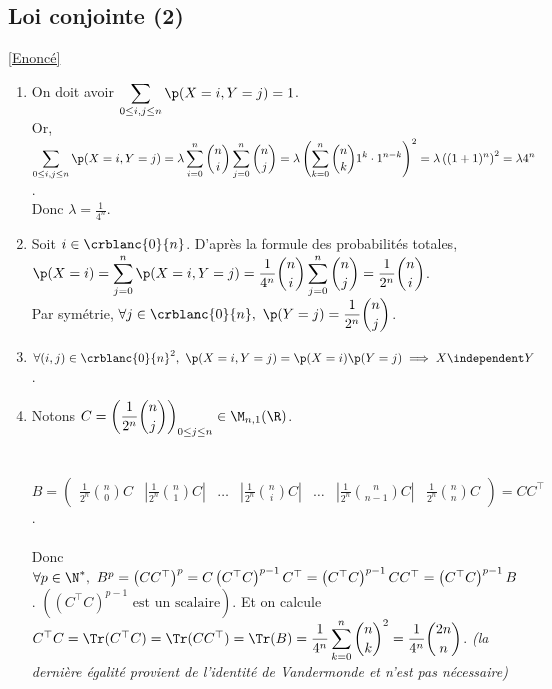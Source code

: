 \documentclass[8pt]{book}
\begin{document}
	\subsection{Loi conjointe (2) }
	\label{Loi conjointe 2 corrigé}
	\textcolor{blue}{\hyperref[Loi conjointe 2]{[Enoncé]}}\\
	\begin{enumerate}
		\item On doit avoir $\displaystyle\sum\limits_{0\leq i,j\leq n}\p(X=i,Y=j)=1$.\\
		Or, $\displaystyle\sum\limits_{0\leq i,j\leq n}\p(X=i,Y=j)=\lambda\sum\limits_{i=0}^n\binom{n}{i}\sum\limits_{j=0}^n\binom{n}{j}=\lambda\left(\sum\limits_{k=0}^n\binom{n}{k}1^k\cdot 1^{n-k}\right)^2=\lambda\left((1+1)^n\right)^2=\lambda 4^n$.\\
		Donc $\lambda=\displaystyle\frac{1}{4^n}$.
		\item Soit $i\in \crblanc{0}{n}$. D'après la formule des probabilités totales,\\
		$\p(X=i)=\displaystyle\sum\limits_{j=0}^n\p(X=i,Y=j)=\frac{1}{4^n}\binom{n}{i}\sum\limits_{j=0}^n\binom{n}{j}=\frac{1}{2^n}\binom{n}{i}$.\\
		Par symétrie, $\forall j\in \crblanc{0}{n},\ \p(Y=j)=\displaystyle\frac{1}{2^n}\binom{n}{j}$.
		\item $\forall (i,j)\in \crblanc{0}{n}^2,\ \p(X=i,Y=j)=\p(X=i)\p(Y=j)\implies X\independent Y$.
		\item Notons $C=\left(\displaystyle\frac{1}{2^n}\binom{n}{j}\right)_{0\leq j\leq n}\in \M_{n,1}(\R)$.\\\\\\
		$B=
		\begin{pmatrix}
			\displaystyle\frac{1}{2^n}\binom{n}{0}C&\left|\displaystyle\frac{1}{2^n}\binom{n}{1}C\right|&\dots&\left|\displaystyle\frac{1}{2^n}\binom{n}{i}C\right|&\dots&\left|\displaystyle\frac{1}{2^n}\binom{n}{n-1}C\right|&\displaystyle\frac{1}{2^n}\binom{n}{n}C   
		\end{pmatrix}=CC^\top$.\\\\
		Donc $\forall p\in \N^*,\ B^p=\left(CC^\top\right)^p=C\left(C^\top C\right)^{p-1}C^\top=\left(C^\top C\right)^{p-1}CC^\top=\left(C^\top C\right)^{p-1}B$. $\left(\left(C^\top C\right)^{p-1}\text{ est un scalaire}\right)$.
		Et on calcule $C^\top C=\Tr(C^\top C)=\Tr(CC^\top)=\Tr(B)=\displaystyle\frac{1}{4^n}\sum\limits_{k=0}^n\binom{n}{k}^2=\frac{1}{4^n}\binom{2n}{n}$. \textit{(la dernière égalité provient de l'identité de Vandermonde et n'est pas nécessaire)}\\

\end{enumerate}
\end{document}
